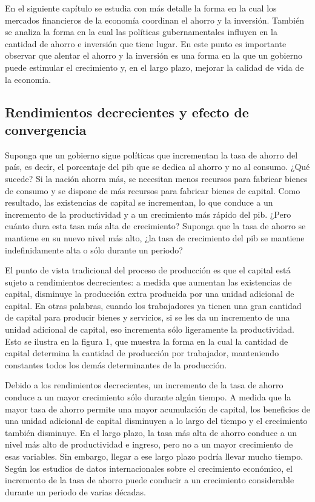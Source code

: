 \documentclass[
]{krantz}
\begin{document}
En el siguiente capítulo se estudia con más detalle la forma en la cual los mercados financieros de la economía coordinan el ahorro y la inversión. También se analiza la forma en la cual las políticas gubernamentales influyen en la cantidad de ahorro e inversión que tiene lugar. En este punto es importante observar que alentar el ahorro y la inversión es una forma en la que un gobierno puede estimular el crecimiento y, en el largo plazo, mejorar la calidad de vida de la economía.

\hypertarget{rendimientos-decrecientes-y-efecto-de-convergencia}{%
\subsection{Rendimientos decrecientes y efecto de convergencia}\label{rendimientos-decrecientes-y-efecto-de-convergencia}}

Suponga que un gobierno sigue políticas que incrementan la tasa de ahorro del país, es decir, el porcentaje del pib que se dedica al ahorro y no al consumo. ¿Qué sucede? Si la nación ahorra más, se necesitan menos recursos para fabricar bienes de consumo y se dispone de más recursos para fabricar bienes de capital. Como resultado, las existencias de capital se incrementan, lo que conduce a un incremento de la productividad y a un crecimiento más rápido del pib. ¿Pero cuánto dura esta tasa más alta de crecimiento? Suponga que la tasa de ahorro se mantiene en su nuevo nivel más alto, ¿la tasa de crecimiento del pib se mantiene indefinidamente alta o sólo durante un periodo?

El punto de vista tradicional del proceso de producción es que el capital está sujeto a rendimientos decrecientes: a medida que aumentan las existencias de capital, disminuye la producción extra producida por una unidad adicional de capital. En otras palabras, cuando los
trabajadores ya tienen una gran cantidad de capital para producir bienes y servicios, si se les da un incremento de una unidad adicional de capital, eso incrementa sólo ligeramente la productividad. Esto se ilustra en la figura 1, que muestra la forma en la cual la cantidad de capital determina la cantidad de producción por trabajador, manteniendo constantes todos los demás determinantes de la producción.

Debido a los rendimientos decrecientes, un incremento de la tasa de ahorro conduce a un mayor crecimiento sólo durante algún tiempo. A medida que la mayor tasa de ahorro permite una mayor acumulación de capital, los beneficios de una unidad adicional de capital disminuyen a lo largo del tiempo y el crecimiento también disminuye. En el largo plazo, la tasa más alta de ahorro conduce a un nivel más alto de productividad e ingreso, pero no a un mayor crecimiento de esas variables. Sin embargo, llegar a ese largo plazo podría llevar mucho tiempo. Según los estudios de datos internacionales sobre el crecimiento económico, el incremento de la tasa de ahorro puede conducir a un crecimiento considerable durante un periodo de varias décadas.
\end{document}
